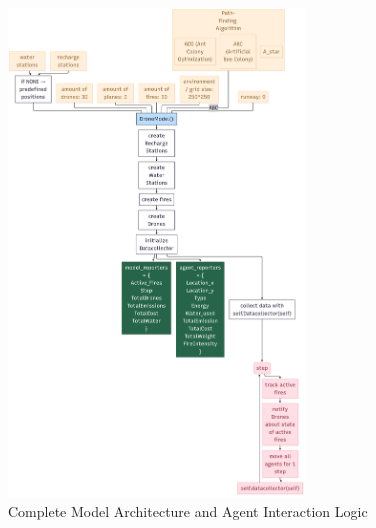 \documentclass[11pt, a4paper]{article}
\begin{document}
\begin{figure}[H]
    \centering
    \includegraphics[width=0.7\textwidth]{figures/modellogic.png}
    \caption{Complete Model Architecture and Agent Interaction Logic}
    \label{fig:modellogic}
\end{figure}
\end{document}

